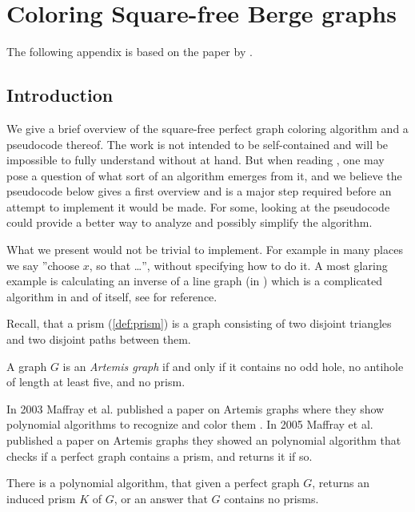 \chapter{Coloring Square-free Berge graphs}
\label{ch:coloringSquareFree}

The following appendix is based on the paper  by \citeauthor{coloringSquareFree} \cite{coloringSquareFree}.

\section{Introduction}
We give a brief overview of the square-free perfect graph coloring algorithm and a pseudocode thereof. The work is not intended to be self-contained and will be impossible to fully understand without \cite{coloringSquareFree} at hand. But when reading \cite{coloringSquareFree}, one may pose a question of what sort of an algorithm emerges from it, and we believe the pseudocode below gives a first overview and is a major step required before an attempt to implement it would be made. For some, looking at the pseudocode could provide a better way to analyze and possibly simplify the algorithm.

What we present would not be trivial to implement. For example in many places we say ''choose $x$, so that \dots'', without specifying how to do it. A most glaring example is calculating an inverse of a line graph (in ) which is a complicated algorithm in and of itself, see \cite{Liu2014} for reference.

Recall, that a prism (\cref{def:prism}) is a graph consisting of two disjoint triangles and two disjoint paths between them.

\begin{defnTwo}
  A graph $G$ is an \emph{Artemis graph} if and only if it contains no odd hole, no antihole of length at least five, and no prism.
\end{defnTwo}

In 2003 Maffray et al. published a paper on Artemis graphs where they show polynomial algorithms to recognize and color them \cite{Maffray2006}. In 2005 Maffray et al. published a paper on Artemis graphs \cite{Maffray2005} they showed an polynomial algorithm that checks if a perfect graph contains a prism, and returns it if so.

\begin{theorem}{\cite{Maffray2005}}
  \label{thm:getPrism}
  There is a polynomial algorithm, that given a perfect graph $G$, returns an induced prism $K$ of $G$, or an answer that $G$ contains no prisms.
\end{theorem}



